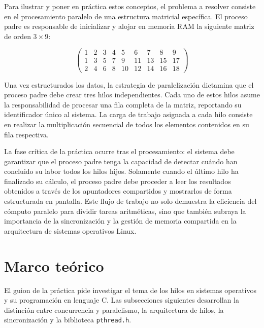Para ilustrar y poner en práctica estos conceptos, el problema a resolver consiste en el procesamiento paralelo de una estructura matricial específica. El proceso padre es responsable de inicializar y alojar en memoria RAM la siguiente matriz de orden $3 \times 9$:

\[
\begin{pmatrix}
1 & 2 & 3 & 4 & 5 & 6 & 7 & 8 & 9 \\
1 & 3 & 5 & 7 & 9 & 11 & 13 & 15 & 17 \\
2 & 4 & 6 & 8 & 10 & 12 & 14 & 16 & 18
\end{pmatrix}
\]

Una vez estructurados los datos, la estrategia de paralelización dictamina que el proceso padre debe crear tres hilos independientes. Cada uno de estos hilos asume la responsabilidad de procesar una fila completa de la matriz, reportando su identificador único al sistema. La carga de trabajo asignada a cada hilo consiste en realizar la multiplicación secuencial de todos los elementos contenidos en su fila respectiva. 

La fase crítica de la práctica ocurre tras el procesamiento: el sistema debe garantizar que el proceso padre tenga la capacidad de detectar cuándo han concluido su labor todos los hilos hijos. Solamente cuando el último hilo ha finalizado su cálculo, el proceso padre debe proceder a leer los resultados obtenidos a través de los apuntadores compartidos y mostrarlos de forma estructurada en pantalla. Este flujo de trabajo no solo demuestra la eficiencia del cómputo paralelo para dividir tareas aritméticas, sino que también subraya la importancia de la sincronización y la gestión de memoria compartida en la arquitectura de sistemas operativos Linux.

\section{Marco teórico}
\label{sec:prac03:marco-teorico}

El guion de la práctica pide investigar el tema de los hilos en sistemas operativos y su programación en lenguaje C. Las subsecciones siguientes desarrollan la distinción entre concurrencia y paralelismo, la arquitectura de hilos, la sincronización y la biblioteca \texttt{pthread.h}.

